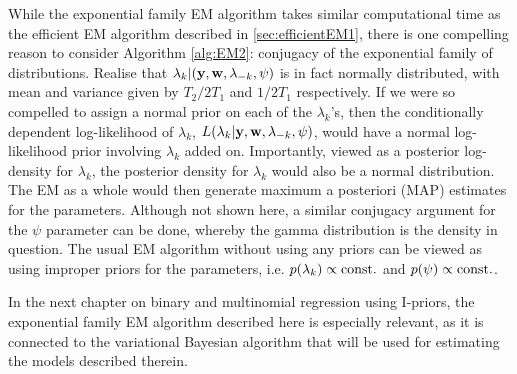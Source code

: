
While the exponential family EM algorithm takes similar computational time as the efficient EM algorithm described in \eqref{sec:efficientEM1}, there is one compelling reason to consider Algorithm \ref{alg:EM2}: conjugacy of the exponential family of distributions.
Realise that $\lambda_k|({\mathbf y},{\mathbf w},\lambda_{-k},\psi)$ is in fact normally distributed, with mean and variance given by $T_2/2T_1$ and $1/2T_1$ respectively.
If we were so compelled to assign a normal prior on each of the $\lambda_k$'s, then the conditionally dependent log-likelihood of $\lambda_k$, $L(\lambda_k|{\mathbf y},{\mathbf w},\lambda_{-k},\psi)$, would have a normal log-likelihood prior involving $\lambda_k$ added on.
Importantly, viewed as a posterior log-density for $\lambda_k$, the posterior density for $\lambda_k$ would also be a normal distribution.
The EM as a whole would then generate maximum a posteriori (MAP) estimates for the parameters.
Although not shown here, a similar conjugacy argument for the $\psi$ parameter can be done, whereby the gamma distribution is the density in question.
The usual EM algorithm without using any priors can be viewed as using improper priors for the parameters, i.e. $p(\lambda_k) \propto \text{const.}\hspace{0.01em}$ and $p(\psi) \propto \text{const.}\hspace{0.01em}$.

In the next chapter on binary and multinomial regression using I-priors, the exponential family EM algorithm described here is especially relevant, as it is connected to the variational Bayesian algorithm \citep{bernardo2003variational} that will be used for estimating the models described therein.

